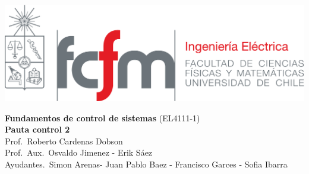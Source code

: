 \documentclass[
  11pt,
  letterpaper,
   addpoints,
   answers
  ]{exam}
\begin{document}
\noindent
\begin{minipage}{0.47\textwidth}
\includegraphics[width=\textwidth]{../fcfm_die}
\end{minipage}
\begin{minipage}{0.53\textwidth}
\begin{center} 
\large\textbf{Fundamentos de control de sistemas} (EL4111-1) \\
\large\textbf{Pauta control 2} \\
\small Prof.~Roberto Cardenas Dobson\\
\small Prof.~Aux.~Osvaldo Jimenez - Erik Sáez\\
\small Ayudantes.~Simon Arenas- Juan Pablo Baez - Francisco Garces - Sofia Ibarra\\
\end{center}
\end{minipage}

\vspace{0.5cm}
\noindent
\vspace{.85cm}
\end{document}
